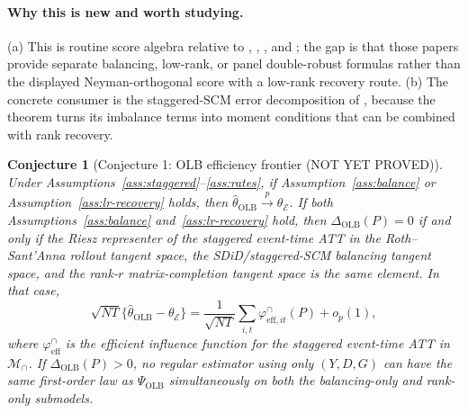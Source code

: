 \documentclass[11pt]{article}
\theoremstyle{definition}
\theoremstyle{plain}
\newtheorem{conjecture}{Conjecture}
\theoremstyle{remark}
\begin{document}
\paragraph{Why this is new and worth studying.}
(a) This is routine score algebra relative to \citet[Sections 2--3]{ArkhangelskyAtheyHirshbergImbensWager2021}, \citet[Section 2.2 and Theorem 1]{BenMichaelFellerRothstein2022}, \citet[Sections 2--3]{AtheyBayatiDoudchenkoImbensKhosravi2021}, and \citet[Sections 2--3]{ArkhangelskyImbens2022}; the gap is that those papers provide separate balancing, low-rank, or panel double-robust formulas rather than the displayed Neyman-orthogonal score with a low-rank recovery route.  (b) The concrete consumer is the staggered-SCM error decomposition of \citet{BenMichaelFellerRothstein2022}, because the theorem turns its imbalance terms into moment conditions that can be combined with rank recovery.

\begin{conjecture}[Conjecture 1: OLB efficiency frontier (NOT YET PROVED)]\label{conj:olb-efficiency}
Under Assumptions~\ref{ass:staggered}--\ref{ass:rates}, if Assumption~\ref{ass:balance} or Assumption~\ref{ass:lr-recovery} holds, then \(\widehat\theta_{\mathrm{OLB}}\overset{p}\to\theta_{\mathcal{E}}\).  If both Assumptions~\ref{ass:balance} and~\ref{ass:lr-recovery} hold, then \(\Delta_{\mathrm{OLB}}(P)=0\) if and only if the Riesz representer of the staggered event-time ATT in the Roth--Sant'Anna rollout tangent space, the SDiD/staggered-SCM balancing tangent space, and the rank-\(r\) matrix-completion tangent space is the same element.  In that case,
\[
\sqrt{NT}\{\widehat\theta_{\mathrm{OLB}}-\theta_{\mathcal{E}}\}
=\frac{1}{\sqrt{NT}}\sum_{i,t}\varphi_{\mathrm{eff},it}^{\cap}(P)+o_p(1),
\]
where \(\varphi_{\mathrm{eff}}^{\cap}\) is the efficient influence function for the staggered event-time ATT in \(\mathcal{M}_{\cap}\).  If \(\Delta_{\mathrm{OLB}}(P)>0\), no regular estimator using only \((Y,D,G)\) can have the same first-order law as \(\Psi_{\mathrm{OLB}}\) simultaneously on both the balancing-only and rank-only submodels.
\end{conjecture}
\end{document}
